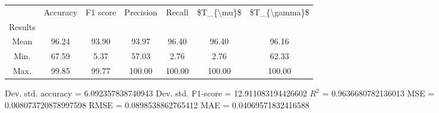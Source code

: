 \begin{tabular}{|c|c|c|c|c|c|c|}
\toprule
{} &  Accuracy &  F1 score &  Precision &  Recall &  \$T\_\{\textbackslash mu\}\$ &  \$T\_\{\textbackslash gamma\}\$ \\
Results &           &           &            &         &            &               \\
\hline
Mean    &     96.24 &     93.90 &      93.97 &   96.40 &      96.40 &         96.16 \\
Min.    &     67.59 &      5.37 &      57.03 &    2.76 &       2.76 &         62.33 \\
Max.    &     99.85 &     99.77 &     100.00 &  100.00 &     100.00 &        100.00 \\
\bottomrule
\end{tabular}

 Dev. std. accuracy = 6.092357838740943
 Dev. std. F1-score = 12.911083194426602
 $R^2$ = 0.9636680782136013
 MSE = 0.008073720878997598
 RMSE = 0.0898538862765412
 MAE = 0.04069571832416588